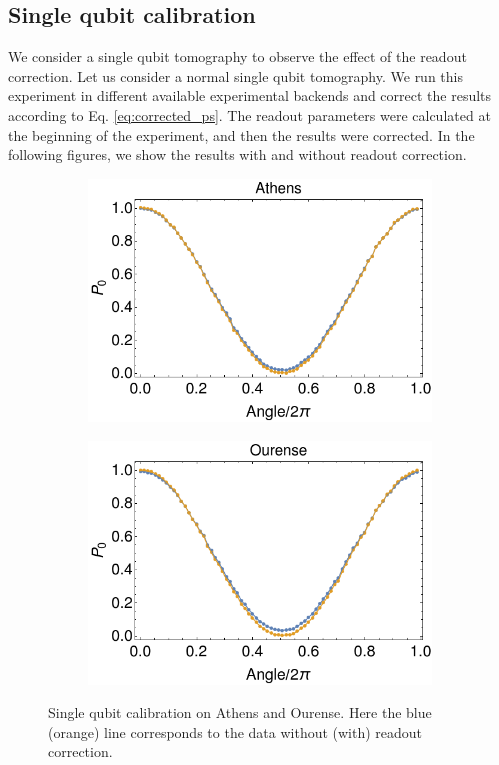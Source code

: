 \subsection{Single qubit calibration}

We consider a single qubit tomography to observe the effect of the readout correction. Let us consider a normal single qubit tomography. We run this experiment in different available experimental backends and correct the results according to Eq. \ref{eq:corrected_ps}. The readout parameters were calculated at the beginning of the experiment, and then the results were corrected. In the following figures, we show the results with and without readout correction.

\begin{figure}[H]
    \centering
    \begin{subfigure}{.5\textwidth}
      \centering
      \includegraphics[width=\textwidth]{Figures/Calibrations/calibration_athens.png}
    \end{subfigure}%
    \begin{subfigure}{.5\textwidth}
      \centering
      \includegraphics[width=\textwidth]{Figures/Calibrations/calibration_ourense.png}
    \end{subfigure}
    \caption{Single qubit calibration on Athens and Ourense. Here the blue (orange) line corresponds to the data without (with) readout correction.}
    \label{fig:pc_yorktown_sphere}
\end{figure}

